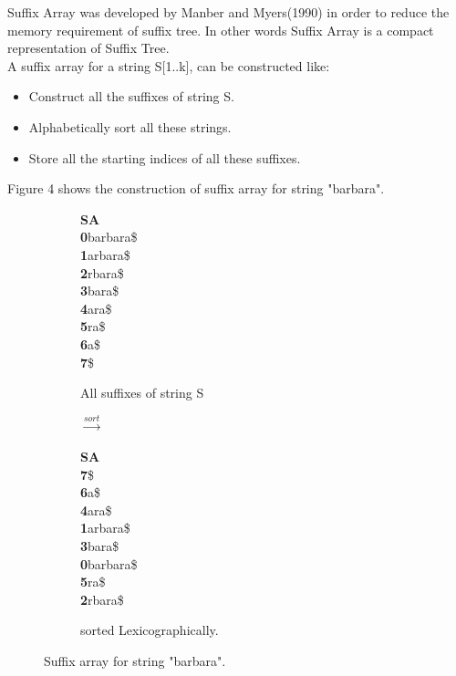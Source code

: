 \documentclass[11pt,a4paper]{report}
\begin{document}
Suffix Array was developed by Manber and Myers(1990) in order to reduce the memory requirement of suffix tree. In other words Suffix Array is a compact representation of Suffix Tree. \\
A suffix array for a string S[1..k], can be constructed like:
\begin{itemize} 
	\item  Construct all the suffixes of string S.
	\item  Alphabetically sort all these strings.
	\item Store all the starting indices of all these suffixes.
\end{itemize}
Figure 4 shows the construction of suffix array for string "barbara".
\begin{figure}[H]
\centering
\begin{subfigure}{.2\textwidth}
\textbf{SA}  \\
\enspace  \textbf{0}\quad barbara\$\\
\textbf{1}\quad arbara\$\\
\textbf{2}\quad rbara\$\\
\textbf{3}\quad  bara\$\\
\textbf{4}\quad   ara\$\\
\textbf{5}\quad     ra\$\\
\textbf{6}\quad     a\$\\
\textbf{7}\quad       \$
  \caption{All suffixes of string S}
  \label{fig:sub1}
\end{subfigure}%
\begin{subfigure}{.2\textwidth}
\textbf{$\xrightarrow{sort}$}
\label{fig:sub1}
\end{subfigure}%
\begin{subfigure}{.3\textwidth}
\textbf{SA} \\
\textbf{7}\quad \$\\
\textbf{6}\quad a\$\\
\textbf{4}\quad ara\$\\
\textbf{1}\quad arbara\$\\
\textbf{3}\quad bara\$\\
\textbf{0}\quad barbara\$\\
\textbf{5}\quad ra\$\\
\textbf{2}\quad rbara\$
 \caption{sorted  Lexicographically.}
  \label{fig:Burrows-Wheeler transform}
\end{subfigure}
\caption{Suffix array for string "barbara".}
\label{fig:test}
\end{figure}
\end{document}
